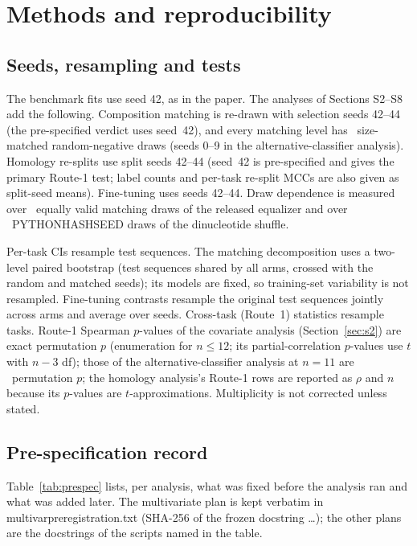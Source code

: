 \documentclass[journal,onecolumn,10pt,letterpaper]{IEEEtran}
\newcommand{\tasku}{\textunderscore\allowbreak}
\DeclareRobustCommand{\task}[1]{{\normalfont\ttfamily\upshape\let\_\tasku #1}}
\begin{document}
\section{Methods and reproducibility}\label{sec:s1}

\subsection{Seeds, resampling and tests}
The benchmark fits use seed 42, as in the paper. The analyses of Sections S2--S8 add the following.
Composition matching is re-drawn with selection seeds 42--44 (the pre-specified verdict uses
seed~42), and every matching level has \smNrandom\ size-matched random-negative draws (seeds 0--9 in the
alternative-classifier analysis). Homology re-splits use split seeds 42--44 (seed~42 is pre-specified
and gives the primary Route-1 test; label counts and per-task re-split MCCs are also given as split-seed
means). Fine-tuning uses seeds 42--44. Draw dependence is measured over \smDraws\ equally valid matching
draws of the released equalizer and over \smHashDraws\ \task{PYTHONHASHSEED} draws of the dinucleotide
shuffle.

Per-task CIs resample test sequences. The matching decomposition uses a two-level paired bootstrap
(test sequences shared by all arms, crossed with the random and matched seeds); its models are
fixed, so training-set variability is not resampled. Fine-tuning contrasts resample the original
test sequences jointly across arms and average over seeds. Cross-task (Route~1) statistics resample
tasks. Route-1 Spearman $p$-values of the covariate analysis (Section~\ref{sec:s2}) are exact
permutation $p$ (enumeration for $n\le12$; its partial-correlation $p$-values use $t$ with $n{-}3$ df);
those of the alternative-classifier analysis at $n=11$ are
\smAltPmethod\ permutation $p$; the homology analysis's Route-1 rows are reported as $\rho$ and $n$
because its $p$-values are $t$-approximations. Multiplicity is not corrected unless stated.

\subsection{Pre-specification record}
Table~\ref{tab:prespec} lists, per analysis, what was fixed before the analysis ran and what was added
later. The multivariate plan is kept verbatim in \task{multivar\_preregistration.txt} (SHA-256 of
the frozen docstring \task{\smMultivarPreregSha}\ldots); the other plans are the docstrings of the
scripts named in the table.
\end{document}
